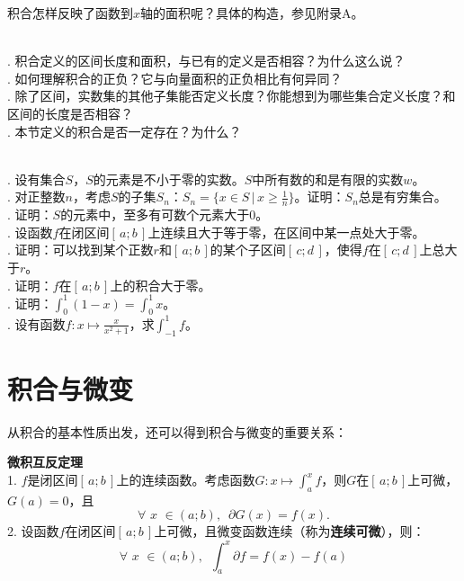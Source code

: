 \documentclass[12pt,UTF8]{ctexbook}
\begin{document}
积合怎样反映了函数到$x$轴的面积呢？具体的构造，参见附录A。

\begin{sk}
    \mbox{} \\
    . 积合定义的区间长度和面积，与已有的定义是否相容？为什么这么说？\\
    . 如何理解积合的正负？它与向量面积的正负相比有何异同？\\
    . 除了区间，实数集的其他子集能否定义长度？你能想到为哪些集合定义长度？和区间的长度是否相容？\\
    . 本节定义的积合是否一定存在？为什么？
\end{sk}

\begin{xt}
    \mbox{} \\
    . 设有集合$S$，$S$的元素是不小于零的实数。$S$中所有数的和是有限的实数$w$。\\
    . 对正整数$n$，考虑$S$的子集$S_n$：$S_n = \{x\in S \, | \, x \geqslant \frac{1}{n}\}$。证明：$S_n$总是有穷集合。\\
    . 证明：$S$的元素中，至多有可数个元素大于$0$。\\
    . 设函数$f$在闭区间$[\,a; b\,]$上连续且大于等于零，在区间中某一点处大于零。\\
    . 证明：可以找到某个正数$r$和$[\,a; b\,]$的某个子区间$[\,c;d\,]$，使得$f$在$[\,c;d\,]$上总大于$r$。\\
    . 证明：$f$在$[\,a; b\,]$上的积合大于零。\\
    . 证明：$\int_0^1 (1 - x) = \int_0^1 x$。\\
    . 设有函数$f: x\mapsto \frac{x}{x^2+1}$，求$\int_{-1}^1 f$。\\
\end{xt}

\section{积合与微变}
从积合的基本性质出发，还可以得到积合与微变的重要关系：

\begin{tm}{\textbf{微积互反定理}}
    \mbox{} \\
    1. $f$是闭区间$[\,a; b\,]$上的连续函数。考虑函数$G: x\mapsto \int_a^x f$，则$G$在$[\,a; b\,]$上可微，
    $G(a) = 0$，且
    $$\forall \,\, x\,\,\in(a; b), \,\,\, \partial G (x) = f(x).$$
    2. 设函数$f$在闭区间$[\,a; b\,]$上可微，且微变函数连续（称为\textbf{连续可微}），则：
    $$ \forall \,\, x\,\,\in(a; b), \,\,\, \int_a^x \partial f = f(x) - f(a) $$
\end{tm}
\end{document}
